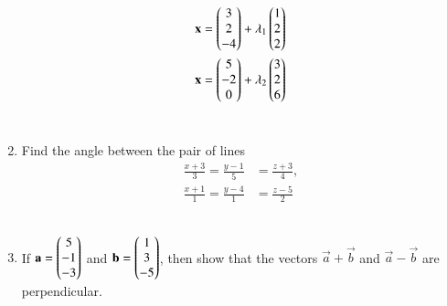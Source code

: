 \begin{enumerate}[label=\arabic*.,ref=\thesubsection.\theenumi]
\begin{align}
\mathbf{x} &= \begin{pmatrix}3\\2\\-4\end{pmatrix} + \lambda_1\begin{pmatrix}1 \\ 2 \\2\end{pmatrix}
\\
\mathbf{x} &= \begin{pmatrix}5\\-2\\0\end{pmatrix} + \lambda_2\begin{pmatrix}3 \\ 2 \\6\end{pmatrix}
\end{align}
%
\\
\solution 

\item Find the angle between the pair of lines
\begin{align}
\frac{x+3}{3} = \frac{y-1}{5} &= \frac{z+3}{4}, 
\\
\frac{x+1}{1} = \frac{y-4}{1} &= \frac{z-5}{2} 
\end{align}
%
\\
\solution 

%
\item If 
$\mathbf{a}=\begin{pmatrix}5\\-1\\-3\end{pmatrix}$
  and 
$\mathbf{b}=\begin{pmatrix}1\\3\\-5\end{pmatrix}$,
%
then show that the vectors $\vec{a}+\vec{b}$ and $\vec{a}-\vec{b}$ are perpendicular.
%
\\
\solution 

%


\end{enumerate}
